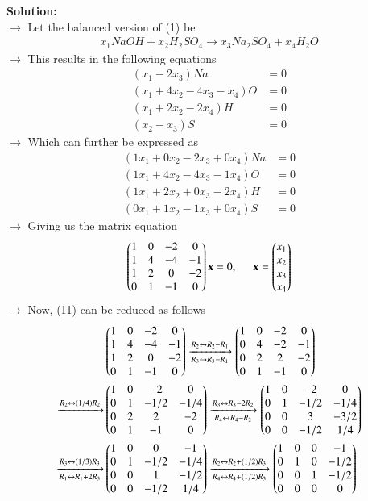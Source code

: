 \documentclass[journal]{IEEEtran}
\begin{document}
\textbf{Solution:}\\
$\rightarrow$ Let the balanced version of (1) be
\begin{align}
    x_1NaOH + x_2H_2SO_4 \rightarrow x_3Na_2SO_4 + x_4H_2O
\end{align}
$\rightarrow$ This results in the following equations
\begin{align}
    (x_1 - 2x_3)Na &= 0 \\
    (x_1 + 4x_2 - 4x_3 - x_4)O &= 0 \\
    (x_1 + 2x_2 - 2x_4)H &= 0 \\
    (x_2 - x_3)S &= 0
\end{align}
$\rightarrow$ Which can further be expressed as
\begin{align}
    (1x_1 + 0x_2 - 2x_3 + 0x_4)Na &= 0 \\
    (1x_1 + 4x_2 - 4x_3 - 1x_4)O &= 0 \\
    (1x_1 + 2x_2 + 0x_3 - 2x_4)H &= 0 \\
    (0x_1 + 1x_2 - 1x_3 + 0x_4)S &= 0
\end{align}
$\rightarrow$ Giving us the matrix equation
\begin{align}
    \begin{pmatrix}1&0&-2&0\\1&4&-4&-1\\1&2&0&-2\\0&1&-1&0\end{pmatrix}\mathbf{x} = 0, \hspace{0.5cm} \mathbf{x} = \begin{pmatrix}x_1\\x_2\\x_3\\x_4\end{pmatrix}
\end{align}
$\rightarrow$ Now, (11) can be reduced as follows
\begin{align}
&\begin{pmatrix}1&0&-2&0\\1&4&-4&-1\\1&2&0&-2\\0&1&-1&0\end{pmatrix}\xrightarrow[R_3 \leftrightarrow R_3 - R_1]{R_2 \leftrightarrow R_2 - R_1}\begin{pmatrix}1&0&-2&0\\0&4&-2&-1\\0&2&2&-2\\0&1&-1&0\end{pmatrix} \\
\xrightarrow{R_2 \leftrightarrow (1/4)R_2}&\begin{pmatrix}1&0&-2&0\\0&1&-1/2&-1/4\\0&2&2&-2\\0&1&-1&0\end{pmatrix}\xrightarrow[R_4 \leftrightarrow R_4 - R_2]{R_3 \leftrightarrow R_3 - 2R_2}\begin{pmatrix}1&0&-2&0\\0&1&-1/2&-1/4\\0&0&3&-3/2\\0&0&-1/2&1/4\end{pmatrix} \\
\xrightarrow[R_1 \leftrightarrow R_1 + 2R_3]{R_3 \leftrightarrow (1/3)R_3}&\begin{pmatrix}1&0&0&-1\\0&1&-1/2&-1/4\\0&0&1&-1/2\\0&0&-1/2&1/4\end{pmatrix}\xrightarrow[R_4 \leftrightarrow R_4 + (1/2)R_3]{R_2 \leftrightarrow R_2 + (1/2)R_3}\begin{pmatrix}1&0&0&-1\\0&1&0&-1/2\\0&0&1&-1/2\\0&0&0&0\end{pmatrix}
\end{align}
\end{document}

